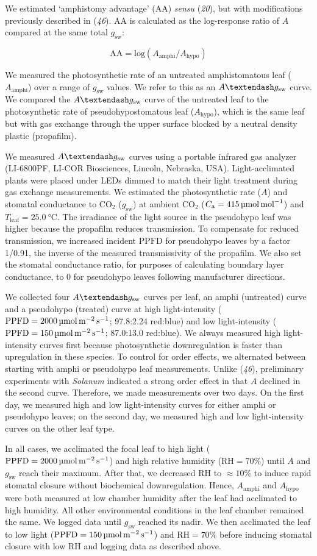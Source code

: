 \documentclass[
  letterpaper,
  DIV=11,
  numbers=noendperiod]{scrartcl}
\newcommand{\aax}{$\mathrm{AA}$}
\newcommand{\Aamphi}{$A_{\mathrm{amphi}}$}
\newcommand{\Ahypo}{$A_{\mathrm{hypo}}$}
\newcommand{\agcurve}{$A \textendash g_\text{sw}$}
\newcommand{\caequals}[1]{$C_\mathrm{a} = \qty{#1}{\micro\mol\raiseto{-1}\mol}$}
\newcommand{\gsw}{$g_\text{sw}$}
\newcommand{\ppfd}{$\mathrm{PPFD}$}
\newcommand{\ppfdequals}[1]{$\mathrm{PPFD} = \qty{#1}{\micro\mol\raiseto{-2}\meter\raiseto{-1}\second}$}
\newcommand{\rh}{$\mathrm{RH}$}
\newcommand{\rhequals}[1]{$\mathrm{RH} = #1\%$}
\newcommand{\tleafequals}[1]{$T_\mathrm{leaf} = \qty{#1}{\degreeCelsius}$}
\begin{document}
We estimated `amphistomy advantage' (\aax) \emph{sensu} (\emph{20}), but
with modifications previously described in (\emph{46}). \aax{} is
calculated as the log-response ratio of \(A\) compared at the same total
\gsw:

\[\mathrm{AA} = \mathrm{log}(A_{\mathrm{amphi}} / A_{\mathrm{hypo}})\]

We measured the photosynthetic rate of an untreated amphistomatous leaf
(\Aamphi) over a range of \gsw{} values. We refer to this as an
\agcurve{} curve. We compared the \agcurve{} curve of the untreated leaf
to the photosynthetic rate of pseudohypostomatous leaf (\Ahypo), which
is the same leaf but with gas exchange through the upper surface blocked
by a neutral density plastic (propafilm).

We measured \agcurve{} curves using a portable infrared gas analyzer
(LI-6800PF, LI-COR Biosciences, Lincoln, Nebraska, USA).
Light-acclimated plants were placed under LEDs dimmed to match their
light treatment during gas exchange measurements. We estimated the
photosynthetic rate (\(A\)) and stomatal conductance to CO\(_2\) (\gsw)
at ambient CO\(_2\) (\caequals{415}) and \tleafequals{25.0}. The
irradiance of the light source in the pseudohypo leaf was higher because
the propafilm reduces transmission. To compensate for reduced
transmission, we increased incident \ppfd{} for pseudohypo leaves by a
factor 1/0.91, the inverse of the measured transmissivity of the
propafilm. We also set the stomatal conductance ratio, for purposes of
calculating boundary layer conductance, to 0 for pseudohypo leaves
following manufacturer directions.

We collected four \agcurve{} curves per leaf, an amphi (untreated) curve
and a pseudohypo (treated) curve at high light-intensity
(\ppfdequals{2000}; 97.8:2.24 red:blue) and low light-intensity
(\ppfdequals{150}; 87.0:13.0 red:blue). We always measured high
light-intensity curves first because photosynthetic downregulation is
faster than upregulation in these species. To control for order effects,
we alternated between starting with amphi or pseudohypo leaf
measurements. Unlike (\emph{46}), preliminary experiments with
\emph{Solanum} indicated a strong order effect in that \(A\) declined in
the second curve. Therefore, we made measurements over two days. On the
first day, we measured high and low light-intensity curves for either
amphi or pseudohypo leaves; on the second day, we measured high and low
light-intensity curves on the other leaf type.

In all cases, we acclimated the focal leaf to high light
(\ppfdequals{2000}) and high relative humidity (\rhequals{70}) until
\(A\) and \gsw{} reach their maximum. After that, we decreased \rh{} to
\(\approx 10\%\) to induce rapid stomatal closure without biochemical
downregulation. Hence, \Aamphi{} and \Ahypo{} were both measured at low
chamber humidity after the leaf had acclimated to high humidity. All
other environmental conditions in the leaf chamber remained the same. We
logged data until \gsw{} reached its nadir. We then acclimated the leaf
to low light (\ppfdequals{150}) and \rhequals{70} before inducing
stomatal closure with low \rh{} and logging data as described above.
\end{document}
